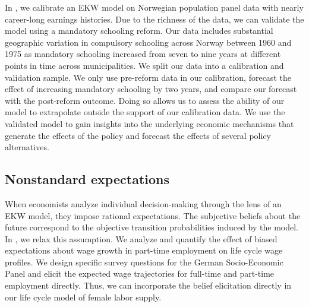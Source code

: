 \noindent In \citet{Bhuller.2018}, we calibrate an EKW model on Norwegian population panel data with nearly career-long earnings histories. Due to the richness of the data, we can validate the model using a mandatory schooling reform. Our data includes substantial geographic variation in compulsory schooling across Norway between 1960 and 1975 as mandatory schooling increased from seven to nine years at different points in time across municipalities. We split our data into a calibration and validation sample. We only use pre-reform data in our calibration, forecast the effect of increasing mandatory schooling by two years, and compare our forecast with the post-reform outcome. Doing so allows us to assess the ability of our model to extrapolate outside the support of our calibration data. We use the validated model to gain insights into the underlying economic mechanisms that generate the effects of the policy and forecast the effects of several policy alternatives.
\subsection{Nonstandard expectations}
When economists analyze individual decision-making through the lens of an EKW model, they impose rational expectations. The subjective beliefs about the future correspond to the objective transition probabilities induced by the model.\\

\noindent In \citet{Eisenhauer.2020a}, we relax this assumption. We analyze and quantify the effect of biased expectations about wage growth in part-time employment on life cycle wage profiles. We design specific survey questions for the German Socio-Economic Panel \citep{Goebel.2019} and elicit the expected wage trajectories for full-time and part-time employment directly. Thus, we can incorporate the belief elicitation directly in our life cycle model of female labor supply.
